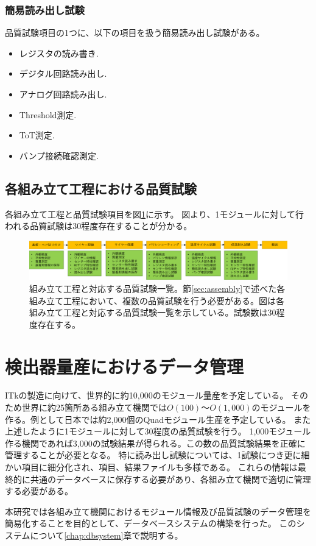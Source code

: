 \clearpage
\subsubsection{簡易読み出し試験}
品質試験項目の1つに、以下の項目を扱う簡易読み出し試験がある。
\begin{itemize}
  \item レジスタの読み書き.
  \item デジタル回路読み出し.
  \item アナログ回路読み出し.
  \item Threshold測定.
  \item ToT測定.
  \item バンプ接続確認測定.
\end{itemize}

\subsection{各組み立て工程における品質試験}

各組み立て工程と品質試験項目を図\ref{stage_test_flow}に示す。
図より、1モジュールに対して行われる品質試験は30程度存在することが分かる。

\begin{figure}[bpt]\centering
\includegraphics[width=15cm]{./stage_test_flow.png}
\caption[組み立て工程と対応する品質試験一覧]{組み立て工程と対応する品質試験一覧。節\ref{sec:assembly}で述べた各組み立て工程において、複数の品質試験を行う必要がある。図は各組み立て工程と対応する品質試験一覧を示している。試験数は30程度存在する。}
\label{stage_test_flow}
\end{figure}

\section{検出器量産におけるデータ管理}
ITkの製造に向けて、世界的に約10,000のモジュール量産を予定している。
そのため世界に約25箇所ある組み立て機関では$O(100)〜O(1,000)$のモジュールを作る。例として日本では約2,000個のQuadモジュール生産を予定している。
また上述したように1モジュールに対して30程度の品質試験を行う。
1,000モジュール作る機関であれば3,000の試験結果が得られる。この数の品質試験結果を正確に管理することが必要となる。
特に読み出し試験については、1試験につき更に細かい項目に細分化され、項目、結果ファイルも多様である。
これらの情報は最終的に共通のデータベースに保存する必要があり、各組み立て機関で適切に管理する必要がある。

本研究では各組み立て機関におけるモジュール情報及び品質試験のデータ管理を簡易化することを目的として、データベースシステムの構築を行った。
このシステムについて\ref{chap:dbsystem}章で説明する。

